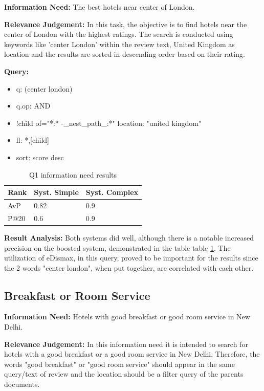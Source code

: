 \documentclass[sigconf]{acmart}
\begin{document}
\textbf{Information Need:} The best hotels near center of London.

\textbf{Relevance Judgement:} In this task, the objective is to find hotels near the center of London with the highest ratings. The search is conducted using keywords like 'center London' within the review text, United Kingdom as location and the results are sorted in descending order based on their rating.

\textbf{Query:}

\begin{itemize}
    \item q: (center london)
    \item q.op: AND
    \item {!child of="*:* -\_nest\_path\_:*"} location: "united kingdom"
    \item fl: *,[child]
    \item sort: score desc
\end{itemize}

\begin{table}[h]
\caption{Q1 information need results}
\label{tab:q1}
\begin{tabular}{lll}
\toprule
Rank & Syst. Simple & Syst. Complex\\
\midrule
AvP & 0.82 & 0.9  \\
P@20 & 0.6 & 0.9 \\
\bottomrule
\end{tabular}
\end{table}

\textbf{Result Analysis:} Both systems did well, although there is a notable increased precision on the boosted system, demonstrated in the table table \ref{tab:q1}. The utilization of eDismax, in this query, proved to be important for the results since the 2 words "center london", when put together, are correlated with each other.

\subsection{Breakfast or Room Service}


\textbf{Information Need:} Hotels with good breakfast or good room service in New Delhi.

\textbf{Relevance Judgement:} In this information need it is intended to search for hotels with a good breakfast or a good room service in New Delhi. Therefore, the words "good breakfast" or "good room service" should appear in the same query/text of review and the location should be a filter query of the parents documents.
\end{document}
